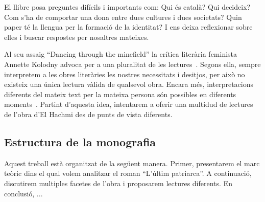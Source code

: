 El llibre posa preguntes difícils i importants com:
Qui és català? Qui decideix?
Com s'ha de comportar una dona entre dues cultures i dues societats?
Quin paper té la llengua per la formació de la identitat?
I ens deixa reflexionar sobre elles i buscar respostes per nosaltres mateixes.

Al seu assaig ``Dancing through the minefield'' la crítica literària feminista Annette Kolodny advoca per a una pluralitat de les lectures~\autocite{Kolodny1980}.
Segons ella, sempre interpretem a les obres literàries les nostres necessitats i desitjos, per això no existeix una única lectura vàlida de qualsevol obra.
Encara més, interpretacions diferents del mateix text per la mateixa persona són possibles en diferents moments~\autocite{Kolodny1980}.
Partint d'aquesta idea, intentarem a oferir una multidud de lectures de l'obra d'El Hachmi des de punts de vista diferents.

\subsection{Estructura de la monografia}
Aquest treball està organitzat de la següent manera.
Primer, presentarem el marc teòric dins el qual volem analitzar el roman ``L'últim patriarca''.
A continuació, discutirem multiples facetes de l'obra i proposarem lectures diferents.
En conclusió, ...

\begin{comment}
Fragestellung:
??
verschiedene readings anbieten:
* interseccionalitat
* translation/language
* laurie penny

--> adrienne rich/anette kolodny in die intro nehmen
Annette Kolodny: "In my view, our purpose is not and should not be the formulation of
any single reading method or potentially procrustean set of critical procedures[...] Instead, as I see it, our
task is to initiate nothing less than a playful pluralism, responsice to the possibilities of multiple critical
schools and methods, but captive of none.."

Leitfragen/themen:
* Qui és català? Qui decideix?
* La dona entre dues cultures i dues societats: expectacions, sentiments,... | interseccionalitat
* La dona en una societat machista                                           |
* coming-of-age
* el paper de la llengua

------

Motto candidates:

“The greatest masterpiece in literature is only a dictionary out of order.”
― Jean Cocteau
VA: Jean Cocteau once quipped that even the greatest masterpieces of literature are nothing but a
dictionary out of order.
(Stavans: Dictionaries Interview)

"IS: Every translation is a misrepresentation."
(Stavans: Dictionaries Interview)
\end{comment}
